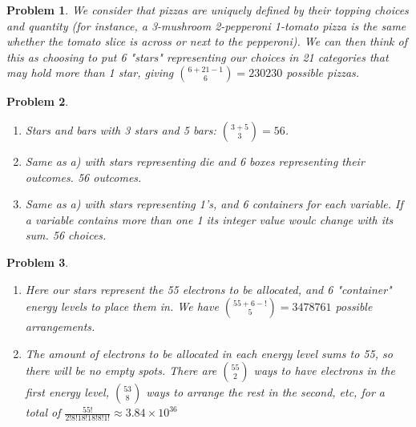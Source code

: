 \documentclass{article}
\theoremstyle{mystyle}
\newtheorem{prob}{Problem}
\begin{document}
\begin{prob}
    We consider that pizzas are uniquely defined by their topping choices and quantity (for instance, a 3-mushroom 2-pepperoni 1-tomato pizza is the same whether the tomato slice is across or next to the pepperoni). We can then think of this as choosing to put 6 "stars" representing our choices in 21 categories that may hold more than 1 star, giving ${6+21-1 \choose 6}=230230$ possible pizzas.
\end{prob}

\begin{prob}
    \begin{enumerate}
        \item Stars and bars with 3 stars and 5 bars: ${3+5 \choose 3}= 56$.
        \item Same as a) with stars representing die and 6 boxes representing their outcomes. 56 outcomes.
        \item Same as a) with stars representing 1's, and 6 containers for each variable. If a variable contains more than one 1 its integer value woulc change with its sum. 56 choices.
    \end{enumerate}
\end{prob}

\begin{prob}
    \begin{enumerate}
        \item Here our stars represent the 55 electrons to be allocated, and 6 "container" energy levels to place them in. We have ${55+6-! \choose 5}=3478761$ possible arrangements.
        \item The amount of electrons to be allocated in each energy level sums to 55, so there will be no empty spots. There are ${55 \choose 2}$ ways to have electrons in the first energy level, ${53 \choose 8}$ ways to arrange the rest in the second, etc, for a total of $\frac{55!}{2!8!18!18!8!1!}\approx3.84\times10^{36}$
    \end{enumerate}
\end{prob}
\end{document}
